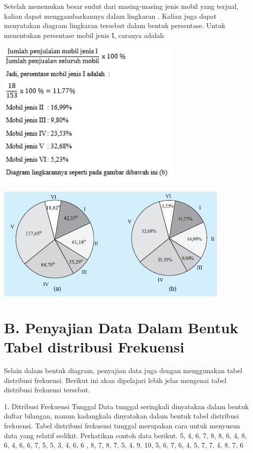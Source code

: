 \documentclass[11pt,fleqn]{book} %
\begin{document}
{Setelah menemukan besar sudut dari masing-masing jenis mobil yang terjual, kalian dapat menggambarkannya dalam lingkaran .
Kalian juga dapat menyatakan diagram lingkaran tersebut dalam bentuk persentase. Untuk menentukan persentase mobil jenis I, caranya adalah 


\includegraphics[width = 9.1cm, height= 7.28cm]{Pictures/Gb12_diana.png}

\includegraphics[width = 11.48cm, height= 5.61cm]{Pictures/Gb13_diana.png}



\section{B. Penyajian Data Dalam Bentuk Tabel distribusi Frekuensi}

Selain dalam bentuk diagram, penyajian data juga dengan menggunakan tabel distribusi
frekuensi. Berikut ini akan dipelajari lebih jelas mengenai tabel distribusi frekuensi tersebut.


1. Ditribusi Frekuensi Tunggal
Data tunggal seringkali dinyatakan dalam bentuk daftar bilangan, namun kadangkala
dinyatakan dalam bentuk tabel distribusi frekuensi. Tabel distribusi frekuensi tunggal
merupakan cara untuk menyusun data yang relatif sedikit. Perhatikan contoh data berikut.
5, 4, 6, 7, 8, 8, 6, 4, 8, 6, 4, 6, 6, 7, 5, 5, 3, 4, 6, 6 , 8, 7, 8, 7, 5, 4, 9, 10, 5, 6, 7, 6, 4, 5, 7, 7, 4, 8, 7, 6

}
\end{document}
